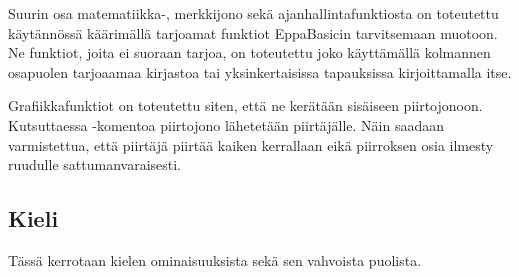 Suurin osa matematiikka-, merkkijono sekä ajanhallintafunktiosta on toteutettu käytännössä
käärimällä  tarjoamat funktiot EppaBasicin tarvitsemaan muotoon.
Ne funktiot, joita  ei suoraan tarjoa, on toteutettu
joko käyttämällä kolmannen osapuolen tarjoaamaa kirjastoa
tai yksinkertaisissa tapauksissa kirjoittamalla itse.

Grafiikkafunktiot on toteutettu siten, että ne kerätään sisäiseen piirtojonoon.
Kutsuttaessa -komentoa piirtojono lähetetään piirtäjälle.
Näin saadaan varmistettua, että piirtäjä piirtää kaiken kerrallaan
eikä piirroksen osia ilmesty ruudulle sattumanvaraisesti.

\subsection{Kieli}
\begin{anfxnote}{}
Tässä kerrotaan kielen ominaisuuksista
sekä sen vahvoista puolista.
\end{anfxnote}
